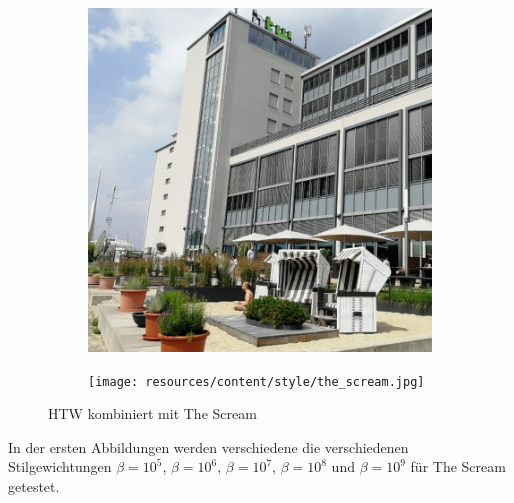 \begin{figure}[H]
    \centering
    \begin{subfigure}[h]{0.20\textwidth}
        \centering
        \includegraphics[width=\textwidth]{resources/content/content/htw-768x768.jpg}
    \end{subfigure}
    \begin{subfigure}[h]{0.20\textwidth}
        \centering
        \texttt{[image: resources/content/style/the\_scream.jpg]}
    \end{subfigure}
    \caption{HTW kombiniert mit The Scream \cite{the_scream_img}}
\end{figure}


In der ersten Abbildungen werden verschiedene die verschiedenen  \\
Stilgewichtungen $ \beta = 10^{5} $, $ \beta = 10^{6} $, $ \beta = 10^{7} $, $ \beta = 10^{8} $ und $ \beta = 10^{9} $ für The Scream getestet.

